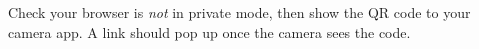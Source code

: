 \begin{minipage}[t]{1.0\linewidth}
\begin{center}
\begin{minipage}[t]{0.24\linewidth}
Check your browser is \emph{not} in private mode, then show the QR code
to your camera app. A link should pop up once the camera sees the code.
\end{minipage}
\hspace{3em}
\begin{minipage}[t]{0.24\linewidth}


\end{minipage}
\end{center}
\end{minipage}
